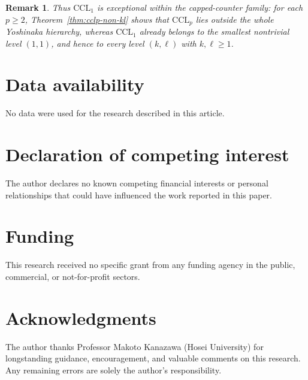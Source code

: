 \documentclass[11pt,a4paper]{article}
\newtheorem{remark}[theorem]{Remark}
\begin{document}
\begin{remark}
Thus $\mathrm{CCL}_1$ is exceptional within the capped-counter family: for each $p\ge2$, Theorem~\ref{thm:cclp-non-kl} shows that $\mathrm{CCL}_p$ lies outside the whole Yoshinaka hierarchy, whereas $\mathrm{CCL}_1$ already belongs to the smallest nontrivial level $(1,1)$, and hence to every level $(k,\ell)$ with $k,\ell\ge1$.
\end{remark}


\section*{Data availability}
No data were used for the research described in this article.

\section*{Declaration of competing interest}
The author declares no known competing financial interests or personal
relationships that could have influenced the work reported in this paper.

\section*{Funding}
This research received no specific grant from any funding agency in the
public, commercial, or not-for-profit sectors.

\section*{Acknowledgments}
The author thanks Professor Makoto Kanazawa (Hosei University) for
longstanding guidance, encouragement, and valuable comments on this
research. Any remaining errors are solely the author's responsibility.
\end{document}
